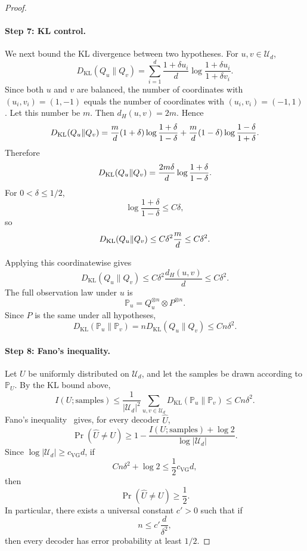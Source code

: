\documentclass{article}
\theoremstyle{plain}
\theoremstyle{definition}
\theoremstyle{remark}
\begin{document}
\begin{proof}
\paragraph{Step 7: KL control.}

We next bound the KL divergence between two hypotheses. For
\(u,v\in\mathcal U_d\),
\[
    D_{\mathrm{KL}}(Q_u\|Q_v)
    =
    \sum_{i=1}^d
    \frac{1+\delta u_i}{d}
    \log\frac{1+\delta u_i}{1+\delta v_i}.
\]
Since both \(u\) and \(v\) are balanced, the number of coordinates with
\((u_i,v_i)=(1,-1)\) equals the number of coordinates with
\((u_i,v_i)=(-1,1)\). Let this number be \(m\). Then
\(d_H(u,v)=2m\). Hence
\[
D_{\rm KL}(Q_u\|Q_v)
=
\frac{m}{d}(1+\delta)\log\frac{1+\delta}{1-\delta}
+
\frac{m}{d}(1-\delta)\log\frac{1-\delta}{1+\delta}.
\]
Therefore
\[
D_{\rm KL}(Q_u\|Q_v)
=
\frac{2m\delta}{d}\log\frac{1+\delta}{1-\delta}.
\]
For \(0<\delta\le 1/2\),
\[
\log\frac{1+\delta}{1-\delta}\le C\delta,
\]
so
\[
D_{\rm KL}(Q_u\|Q_v)
\le
C\delta^2\frac{m}{d}
\le C\delta^2.
\]


Applying this coordinatewise gives
\[
    D_{\mathrm{KL}}(Q_u\|Q_v)
    \le
    C\delta^2\frac{d_H(u,v)}{d}
    \le
    C\delta^2.
\]
The full observation law under \(u\) is
\[
    \mathbb P_u
    =
    Q_u^{\otimes n}\otimes P^{\otimes n}.
\]
Since \(P\) is the same under all hypotheses,
\[
    D_{\mathrm{KL}}(\mathbb P_u\|\mathbb P_v)
    =
    nD_{\mathrm{KL}}(Q_u\|Q_v)
    \le
    Cn\delta^2.
\]

\paragraph{Step 8: Fano's inequality.}
Let \(U\) be uniformly distributed on \(\mathcal U_d\), and let the samples be
drawn according to \(\mathbb P_U\). By the KL bound above,
\[
    I(U;\text{samples})
    \le
    \frac{1}{|\mathcal U_d|^2}
    \sum_{u,v\in\mathcal U_d}
    D_{\mathrm{KL}}(\mathbb P_u\|\mathbb P_v)
    \le
    Cn\delta^2.
\]
Fano's inequality~\citep{CoverT2006} gives, for every decoder \(\widehat U\),
\[
    \Pr(\widehat U\ne U)
    \ge
    1-
    \frac{I(U;\text{samples})+\log 2}{\log|\mathcal U_d|}.
\]
Since \(\log|\mathcal U_d|\ge c_{\mathrm{VG}}d\), if
\[
    Cn\delta^2+\log 2
    \le
    \frac12 c_{\mathrm{VG}}d,
\]
then
\[
    \Pr(\widehat U\ne U)\ge \frac12.
\]
In particular, there exists a universal constant \(c'>0\) such that if
\[
    n\le c'\frac{d}{\delta^2},
\]
then every decoder has error probability at least \(1/2\).


\end{proof}
\end{document}
